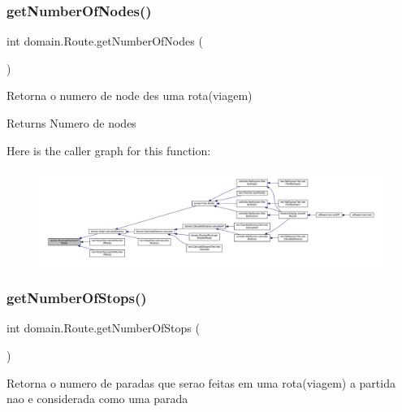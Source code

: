 \subsubsection{\texorpdfstring{get\+Number\+Of\+Nodes()}{getNumberOfNodes()}}
{\footnotesize\ttfamily int domain.\+Route.\+get\+Number\+Of\+Nodes (\begin{DoxyParamCaption}{ }\end{DoxyParamCaption})}

Retorna o numero de node des uma rota(viagem)

\begin{DoxyReturn}{Returns}
Numero de nodes 
\end{DoxyReturn}
Here is the caller graph for this function\+:\nopagebreak
\begin{figure}[H]
\begin{center}
\leavevmode
\includegraphics[width=350pt]{classdomain_1_1_route_a26f7bfa398e907882925e09b197dabec_icgraph}
\end{center}
\end{figure}
\mbox{\label{classdomain_1_1_route_a863264da3af911c200d94f53733e07b4}} 
\subsubsection{\texorpdfstring{get\+Number\+Of\+Stops()}{getNumberOfStops()}}
{\footnotesize\ttfamily int domain.\+Route.\+get\+Number\+Of\+Stops (\begin{DoxyParamCaption}{ }\end{DoxyParamCaption})}

Retorna o numero de paradas que serao feitas em uma rota(viagem) a partida nao e considerada como uma parada

